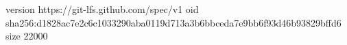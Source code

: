 version https://git-lfs.github.com/spec/v1
oid sha256:d1828ac7e2c6c1033290aba0119d713a3b6bbceda7e9bb6f93d46b93829bffd6
size 22000

